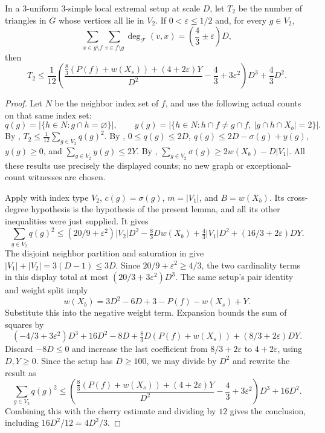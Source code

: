 \begin{lemma}
In a $3$-uniform $3$-simple local extremal setup at scale $D$, let $T_2$ be
the number of triangles in $\overline G$ whose vertices all lie in $V_2$.  If
$0<\varepsilon\le1/2$ and, for every $g\in V_2$,
\[
\sum_{x\in g\setminus f}\sum_{v\in f\setminus g}
\deg_{\mathcal F}(v,x)=\left(\frac43\pm\varepsilon\right)D,
\]
then
\[
T_2\le
\frac1{12}\left(
\frac{\frac83(P(f)+w(X_s))+(4+2\varepsilon)Y}{D^2}
-\frac43+3\varepsilon^2
\right)D^3+\frac43D^2 .
\]
\end{lemma}
\begin{proof}
Let $N$ be the neighbor index set of $f$, and use the following actual
counts on that same index set:
\[
q(g)=|\{h\in N:g\cap h=\varnothing\}|,\qquad
y(g)=|\{h\in N:h\cap f\ne g\cap f,\ |g\cap h\cap X_b|=2\}|.
\]
By ,
$T_2\le\frac1{12}\sum_{g\in V_2}q(g)^2$.
By ,
$0\le q(g)\le2D$, $q(g)\le2D-\sigma(g)+y(g)$,
$y(g)\ge0$, and $\sum_{g\in V_2}y(g)\le2Y$.
By ,
$\sum_{g\in V_2}\sigma(g)\ge2w(X_b)-D|V_1|$.
All these results use precisely the displayed counts; no new graph or
exceptional-count witnesses are chosen.

Apply  with index type $V_2$,
$c(g)=\sigma(g)$, $m=|V_1|$, and $B=w(X_b)$. Its cross-degree hypothesis
is the hypothesis of the present lemma, and all its other inequalities
were just supplied. It gives
\[
\sum_{g\in V_2}q(g)^2\le
(20/9+\varepsilon^2)|V_2|D^2-\tfrac83Dw(X_b)
+\tfrac43|V_1|D^2+(16/3+2\varepsilon)DY.
\]
The disjoint neighbor partition and saturation in
 give
$|V_1|+|V_2|=3(D-1)\le3D$.
Since $20/9+\varepsilon^2\ge4/3$, the two cardinality terms in this
display total at most $(20/3+3\varepsilon^2)D^3$.
The same setup's pair identity and weight split imply
\[
w(X_b)=3D^2-6D+3-P(f)-w(X_s)+Y.
\]
Substitute this into the negative weight term. Expansion bounds the
sum of squares by
\[
(-4/3+3\varepsilon^2)D^3+16D^2-8D
+\tfrac83D(P(f)+w(X_s))+(8/3+2\varepsilon)DY.
\]
Discard $-8D\le0$ and increase the last coefficient from
$8/3+2\varepsilon$ to $4+2\varepsilon$, using $D,Y\ge0$.
Since the setup has $D\ge100$, we may divide by $D^2$ and rewrite the result as
\[
\sum_{g\in V_2}q(g)^2\le
\left(\frac{\frac83(P(f)+w(X_s))+(4+2\varepsilon)Y}{D^2}
-\frac43+3\varepsilon^2\right)D^3+16D^2.
\]
Combining this with the cherry estimate and dividing by $12$ gives
the conclusion, including $16D^2/12=4D^2/3$.
\end{proof}
